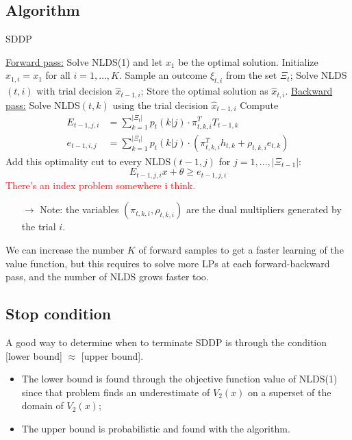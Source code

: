 \documentclass[12pt, openany]{report}
\theoremstyle{definition}
\begin{document}
\subsection{Algorithm}
\begin{algorithm}[H]
	\caption{SDDP}
	\label{algo:sddp}
	\begin{algorithmic}[1]
		\State \underline{Forward pass:}
		\State Solve NLDS(1) and let $x_1$ be the optimal solution. Initialize $\hat x_{1,i}=x_1$ for all $i=1,\dots,K$.
		\State Sample an outcome $\xi_{t,i}$ from the set $\Xi_t$;
		\State Solve NLDS$(t,i)$ with trial decision $\hat x_{t-1, i}$;
		\State Store the optimal solution as $\hat x_{t,i}$.
		\EndFor
		\State \underline{Backward pass:}
		\State Solve NLDS$(t,k)$ using the trial decision $\hat x_{t-1,i}$
		\EndFor 
		\State Compute 
		\begin{equation}
			\begin{aligned}
				E_{t-1,j,i} &= \sum_{k=1}^{|\Xi_t|} p_t(k|j) \cdot \pi_{t,k,i}^T T_{t-1,k}\\
				e_{t-1,i,j} &= \sum_{k=1}^{|\Xi_t|} p_t(k|j)\cdot \left(\pi_{t,k,i}^Th_{t,k} + \rho_{t,k,i}e_{t,k}\right)
			\end{aligned}
		\end{equation}
		\EndFor
		\State Add this optimality cut to every NLDS$(t-1,j)$ for $j=1,\dots,|\Xi_{t-1}|$:
		\begin{equation}
			E_{t-1,j,i}x+\theta \ge e_{t-1,j,i}
		\end{equation}
		\EndFor
		\EndFor
		\State \textcolor{red}{There's an index problem somewhere i think.}
	\end{algorithmic}
\end{algorithm}
\begin{itemize}
	\item [$\to$] Note: the variables $(\pi_{t,k,i}, \rho_{t,k,i})$ are the dual multipliers generated by the trial $i$.
\end{itemize}
We can increase the number $K$ of forward samples to get a faster learning of the value function, but this requires to solve more LPs at each forward-backward pass, and the number of NLDS grows faster too. 
\subsection{Stop condition}
A good way to determine when to terminate SDDP is through the condition [lower bound] $\approx$ [upper bound]. 
\begin{itemize}
	\item The lower bound is found through the objective function value of NLDS(1) since that problem finds an underestimate of $V_2(x)$ on a superset of the domain of $V_2(x)$;
	\item The upper bound is probabilistic and found with the algorithm. 
\end{itemize}
\end{document}
